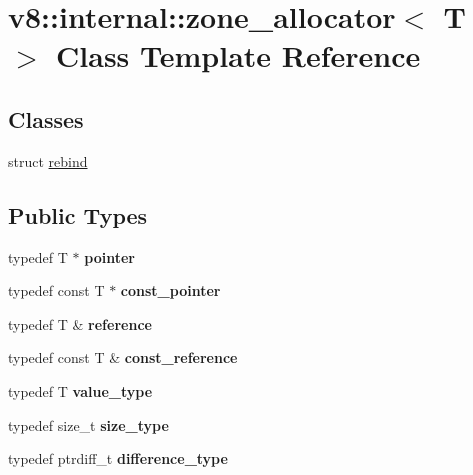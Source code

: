 \hypertarget{classv8_1_1internal_1_1zone__allocator}{}\section{v8\+:\+:internal\+:\+:zone\+\_\+allocator$<$ T $>$ Class Template Reference}
\label{classv8_1_1internal_1_1zone__allocator}
\subsection*{Classes}
\begin{DoxyCompactItemize}
\item 
struct \hyperlink{structv8_1_1internal_1_1zone__allocator_1_1rebind}{rebind}
\end{DoxyCompactItemize}
\subsection*{Public Types}
\begin{DoxyCompactItemize}
\item 
typedef T $\ast$ {\bfseries pointer}\hypertarget{classv8_1_1internal_1_1zone__allocator_ac88f72e9cd57a798719633ae06c962ca}{}\label{classv8_1_1internal_1_1zone__allocator_ac88f72e9cd57a798719633ae06c962ca}

\item 
typedef const T $\ast$ {\bfseries const\+\_\+pointer}\hypertarget{classv8_1_1internal_1_1zone__allocator_aabd57c53ad39267436b4cfd3dc9f8488}{}\label{classv8_1_1internal_1_1zone__allocator_aabd57c53ad39267436b4cfd3dc9f8488}

\item 
typedef T \& {\bfseries reference}\hypertarget{classv8_1_1internal_1_1zone__allocator_a73ad2c4458a6b4d97114e8bcdecb4a90}{}\label{classv8_1_1internal_1_1zone__allocator_a73ad2c4458a6b4d97114e8bcdecb4a90}

\item 
typedef const T \& {\bfseries const\+\_\+reference}\hypertarget{classv8_1_1internal_1_1zone__allocator_a3c843bf2eafdcb6db1c195c9a1cb7a01}{}\label{classv8_1_1internal_1_1zone__allocator_a3c843bf2eafdcb6db1c195c9a1cb7a01}

\item 
typedef T {\bfseries value\+\_\+type}\hypertarget{classv8_1_1internal_1_1zone__allocator_a69f4aa8da7b64ff03d63d7b86af3de6b}{}\label{classv8_1_1internal_1_1zone__allocator_a69f4aa8da7b64ff03d63d7b86af3de6b}

\item 
typedef size\+\_\+t {\bfseries size\+\_\+type}\hypertarget{classv8_1_1internal_1_1zone__allocator_a5d7dae728ae0be78a49211b55a634e12}{}\label{classv8_1_1internal_1_1zone__allocator_a5d7dae728ae0be78a49211b55a634e12}

\item 
typedef ptrdiff\+\_\+t {\bfseries difference\+\_\+type}\hypertarget{classv8_1_1internal_1_1zone__allocator_a0fe1871e429a54a9bd9bec86f1964cb2}{}\label{classv8_1_1internal_1_1zone__allocator_a0fe1871e429a54a9bd9bec86f1964cb2}

\end{DoxyCompactItemize}
